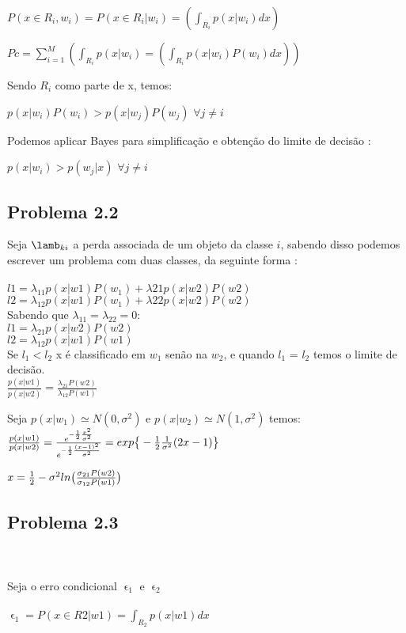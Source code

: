 \documentclass[a4paper, 12pt]{article}
\begin{document}
$P(x\in R_i,w_i)=P(x\in R_i|w_i) = (\int_R_i p(x|w_i)dx)$

$Pc = \sum_{i=1}^M(\int_R_i p(x|w_i) = (\int_R_i p(x|w_i)P(w_i)dx))$

Sendo $R_i$ como parte de x, temos: 

$p(x|w_i)P(w_i) > p(x|w_j)P(w_j) $  $\forall j \neq i $ 

Podemos aplicar Bayes para simplificação e obtenção do limite de decisão :

$p(x|w_i) > p(w_j|x) $  $\forall j \neq i $ \\

\subsection{Problema 2.2}

Seja $\lamb_{ki}$ a perda associada de um objeto da classe $i$, sabendo disso podemos escrever um problema com duas classes, da seguinte forma :
\\ \\
$l1 = \lambda_{11}p(x|w1)P(w_1)+\lambda{21}p(x|w2)P(w2)$ \\
$l2 = \lambda_{12}p(x|w1)P(w_1)+\lambda{22}p(x|w2)P(w2)$ \\

Sabendo que  $\lambda_{11} = \lambda_{22} = 0 : $ \\

$l1 = \lambda_{21}p(x|w2)P(w2)$ \\
$l2 = \lambda_{12}p(x|w1)P(w1)$ \\

Se $l_1 < l_2$ x é classificado em $w_1$ senão na $w_2$, e quando $l_1$ = $l_2$ temos o limite de decisão.\\

$\frac{p(x|w1)}{p(x|w2)} = \frac{\lambda_{21}P(w2)}{\lambda_{12}P(w1)}$

Seja $p(x|w_1) \simeq N(0,\sigma^2)$ e $p(x|w_2) \simeq N(1,\sigma^2)$ temos:\\
$\frac{p(x|w1)}{p(x|w2)} = \frac{e^{-\frac{1}{2}\frac{x^2}{\sigma^2}}}{e^{-\frac{1}{2}\frac{(x-1)^2}{\sigma^2} }} = exp\big{\{}-\frac{1}{2}\frac{1}{\sigma^2}(2x-1)\big{\}}$

$x = \frac{1}{2} - \sigma^2 ln\big{(}\frac{\sigma_{21}P(w2)}{\sigma_{12}P(w1)}\big{)}$

\subsection{Problema 2.3}
\\ \\
Seja o erro condicional $\upvarepsilon_1$ e $\upvarepsilon_2$ \\ \\
$\upvarepsilon_1 = P(x \in R2|w1) = \int_{R_2} p(x|w1)dx$
\end{document}
